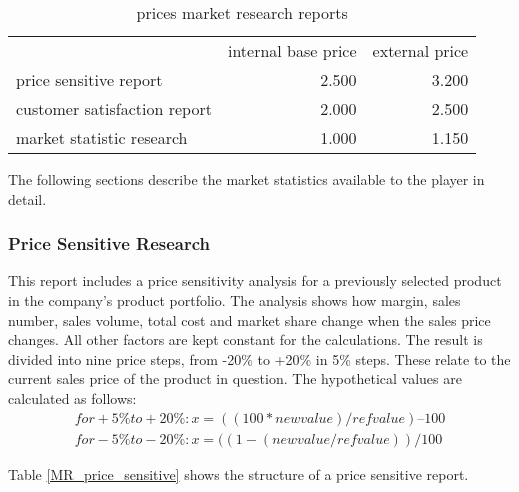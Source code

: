 \begin{table}[ht]
\centering
\begin{tabular}{|l|r|r|}
\hline
        & internal base price  & external price \\
price sensitive report       & 2.500    & 3.200     \\
customer satisfaction report & 2.000    & 2.500     \\
market statistic research    & 1.000    & 1.150     \\
\hline
\end{tabular}
\caption{prices market research reports}
\label{MR_report_price}
\end{table}

The following sections describe the market statistics available to the player in detail.

\subsubsection{Price Sensitive Research}
This report includes a price sensitivity analysis for a previously selected product in the company's product portfolio. The analysis shows how margin, sales number, sales volume, total cost and market share change when the sales price changes. All other factors are kept constant for the calculations. The result is divided into nine price steps, from -20\% to +20\% in 5\% steps. These relate to the current sales price of the product in question. The hypothetical values are calculated as follows:
\begin{equation}
    \begin{aligned}
        for +5\% to +20\%: x = ((100 * new value) / ref value) – 100 \\
        for -5\% to -20\%: x = ((1 - (new value / ref value)) / 100
    \end{aligned}
\end{equation}

Table \ref{MR_price_sensitive} shows the structure of a price sensitive report. 

